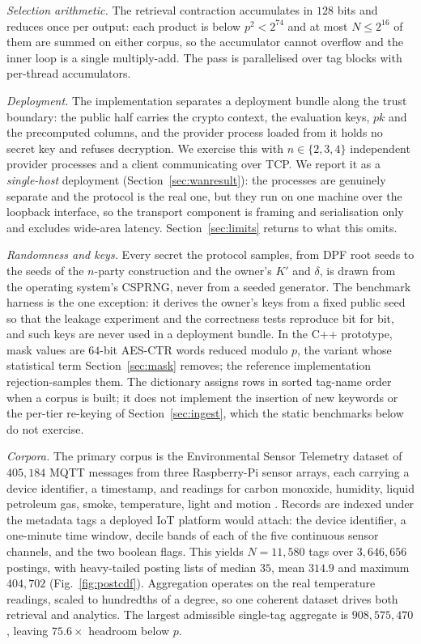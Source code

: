 \documentclass[a4paper,fleqn]{cas-dc}
\begin{document}
\emph{Selection arithmetic.} The retrieval contraction accumulates in $128$
bits and reduces once per output: each product is below $p^2<2^{74}$ and at
most $N\le 2^{16}$ of them are summed on either corpus, so the accumulator
cannot overflow and the inner loop is a single multiply-add. The pass is
parallelised over tag blocks with per-thread accumulators.

\emph{Deployment.} The implementation separates a deployment bundle along
the trust boundary: the public half carries the crypto context, the evaluation keys,
$pk$ and the precomputed columns, and the provider process loaded from it
holds no secret key and refuses decryption. We exercise this with
$n\in\{2,3,4\}$ independent provider processes and a client communicating over
TCP. We report it as a \emph{single-host} deployment
(Section~\ref{sec:wanresult}): the processes are genuinely separate and the
protocol is the real one, but they run on one machine over the loopback
interface, so the transport component is framing and serialisation only and
excludes wide-area latency. Section~\ref{sec:limits} returns to what this
omits.

\emph{Randomness and keys.} Every secret the protocol samples, from DPF root
seeds to the seeds of the $n$-party construction and the owner's $K'$ and
$\delta$, is drawn from the operating system's CSPRNG, never from a seeded
generator. The benchmark harness is the one exception: it derives the owner's
keys from a fixed public seed so that the leakage experiment and the
correctness tests reproduce bit for bit, and such keys are never used in a
deployment bundle. In the C++ prototype, mask values are $64$-bit AES-CTR
words reduced modulo $p$, the variant whose statistical term
Section~\ref{sec:mask} removes; the reference implementation rejection-samples
them. The dictionary assigns rows in
sorted tag-name order when a corpus is built; it does not implement the
insertion of new keywords or the per-tier re-keying of
Section~\ref{sec:ingest}, which the static benchmarks below do not exercise.

\emph{Corpora.} The primary corpus is the Environmental Sensor Telemetry
dataset of $405{,}184$ MQTT messages from three Raspberry-Pi sensor arrays,
each carrying a device identifier, a timestamp, and readings for carbon
monoxide, humidity, liquid petroleum gas, smoke, temperature, light and motion
\citep{stafford_2020_environmental}. Records are indexed under the metadata
tags a deployed IoT platform would attach: the device identifier, a one-minute
time window, decile bands of each of the five continuous sensor channels, and
the two boolean flags. This yields $N=11{,}580$ tags over $3{,}646{,}656$
postings, with heavy-tailed posting lists of median $35$, mean $314.9$ and
maximum $404{,}702$ (Fig.~\ref{fig:postcdf}). Aggregation operates on the real
temperature readings, scaled to hundredths of a degree, so one coherent
dataset drives both retrieval and analytics. The largest admissible single-tag
aggregate is $908{,}575{,}470$, leaving $75.6\times$ headroom below $p$.
\end{document}
